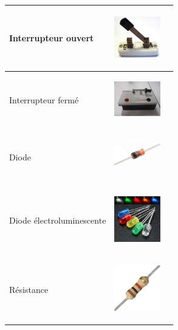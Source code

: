 \documentclass[11pt]{article}
\begin{document}
\begin{center}
\begin{tabular}{ |p{6cm}|p{6cm}|p{6cm}|  }
			Interrupteur ouvert 		&
			\begin{minipage}{.3\textwidth}
				\begin{center}
					\includegraphics[width=2cm]{interrupteur_ouvert.jpg}
				\end{center}
			  \end{minipage}  &  \\\hline
			Interrupteur fermé 			&  
			\begin{minipage}{.3\textwidth}
				\begin{center}
					\includegraphics[width=2cm]{interrupteur_fermé.jpg}
				\end{center}
			  \end{minipage}  &  \\\hline
			Diode 						&  
			\begin{minipage}{.3\textwidth}
				\begin{center}
					\includegraphics[width=2cm]{diode.jpg}
				\end{center}
			  \end{minipage}  &  \\\hline
			Diode électroluminescente 	&  
			\begin{minipage}{.3\textwidth}
				\begin{center}
					\includegraphics[width=2cm]{DEL.jpg}
				\end{center}
			  \end{minipage}  &  \\\hline
			Résistance 					&  
			\begin{minipage}{.3\textwidth}
				\begin{center}
					\includegraphics[width=2cm]{resistance.jpg}
				\end{center}
			  \end{minipage}  &  \\\hline
			
			\end{tabular}
		\end{center}
\end{document}
